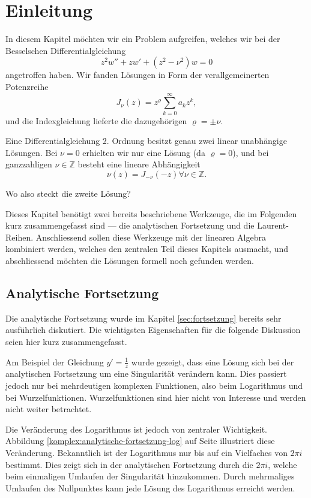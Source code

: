 \section{Einleitung}

In diesem Kapitel möchten wir ein Problem aufgreifen, welches wir bei der Besselschen Differentialgleichung
\[ z^2w''+zw'+(z^2 - \nu^2)w=0\]
angetroffen haben. 
Wir fanden Lösungen in Form der verallgemeinerten Potenzreihe
\[J_\nu(z)=z^\varrho\sum_{k=0}^{\infty}a_kz^k,\]
und die Indexgleichung lieferte die dazugehörigen $\varrho=\pm\nu.$

\begin{problem*} 
 Eine Differentialgleichung 2. Ordnung besitzt genau zwei linear unabhängige Lösungen.
 Bei $\nu=0$ erhielten wir nur eine Lösung (da $\varrho=0$), und bei ganzzahligen $\nu\in\mathbb{Z}$ besteht eine lineare Abhängigkeit
 \[\nu(z) = J_{-\nu}(-z)\forall\nu\in\mathbb{Z}.\]

Wo also steckt die zweite Lösung?
\end{problem*} 

Dieses Kapitel benötigt zwei bereits beschriebene Werkzeuge, die im Folgenden kurz zusammengefasst sind --- die analytischen Fortsetzung und die Laurent-Reihen.
Anschliessend sollen diese Werkzeuge mit der linearen Algebra kombiniert werden, welches den zentralen Teil dieses Kapitels ausmacht, und abschliessend möchten die Lösungen formell noch gefunden werden.

\subsection{Analytische Fortsetzung}
Die analytische Fortsetzung wurde im Kapitel \ref{sec:fortsetzung} bereits sehr ausführlich diskutiert.
Die wichtigsten Eigenschaften für die folgende Diskussion seien hier kurz zusammengefasst.

Am Beispiel der Gleichung $y'=\frac{1}{z}$ wurde gezeigt, dass eine Lösung sich bei der analytischen Fortsetzung um eine Singularität verändern kann.
Dies passiert jedoch nur bei mehrdeutigen komplexen Funktionen, also beim Logarithmus und bei Wurzelfunktionen.
Wurzelfunktionen sind hier nicht von Interesse und werden nicht weiter betrachtet. 

Die Veränderung des Logarithmus ist jedoch von zentraler Wichtigkeit.
Abbildung \ref{komplex:analytische-fortsetzung-log} auf Seite \pageref{komplex:analytische-fortsetzung-log} illustriert diese Veränderung.
Bekanntlich ist der Logarithmus nur bis auf ein Vielfaches von $2\pi i$ bestimmt. Dies zeigt sich in der analytischen Fortsetzung durch die $2\pi i$, welche beim einmaligen Umlaufen der Singularität hinzukommen.
Durch mehrmaliges Umlaufen des Nullpunktes kann jede Lösung des Logarithmus erreicht werden.

